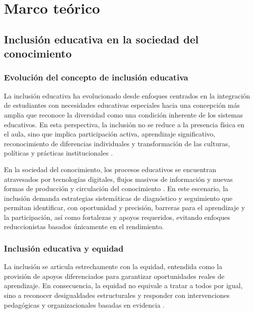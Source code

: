\chapter{Marco teórico}

\begin{refsection}

\section{Inclusión educativa en la sociedad del conocimiento}

\subsection{Evolución del concepto de inclusión educativa}

La inclusión educativa ha evolucionado desde enfoques centrados en la integración de estudiantes con necesidades educativas especiales hacia una concepción más amplia que reconoce la diversidad como una condición inherente de los sistemas educativos. En esta perspectiva, la inclusión no se reduce a la presencia física en el aula, sino que implica participación activa, aprendizaje significativo, reconocimiento de diferencias individuales y transformación de las culturas, políticas y prácticas institucionales \parencite{ainscow2006,unesco2020}.

En la sociedad del conocimiento, los procesos educativos se encuentran atravesados por tecnologías digitales, flujos masivos de información y nuevas formas de producción y circulación del conocimiento \parencite{castells2010}. En este escenario, la inclusión demanda estrategias sistemáticas de diagnóstico y seguimiento que permitan identificar, con oportunidad y precisión, barreras para el aprendizaje y la participación, así como fortalezas y apoyos requeridos, evitando enfoques reduccionistas basados únicamente en el rendimiento.

\subsection{Inclusión educativa y equidad}

La inclusión se articula estrechamente con la equidad, entendida como la provisión de apoyos diferenciados para garantizar oportunidades reales de aprendizaje. En consecuencia, la equidad no equivale a tratar a todos por igual, sino a reconocer desigualdades estructurales y responder con intervenciones pedagógicas y organizacionales basadas en evidencia \parencite{oecd2018}.


\end{refsection}
